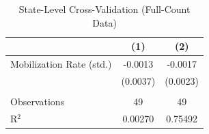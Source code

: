 
\begin{table}[htbp]
   \caption{\label{tab:statelevel} State-Level Cross-Validation (Full-Count Data)}
   \bigskip
   \centering
   \begin{tabular}{lcc}
      \toprule
                               & (1)      & (2)\\  
      \midrule 
      Mobilization Rate (std.) & -0.0013  & -0.0017\\   
                               & (0.0037) & (0.0023)\\   
       \\
      Observations             & 49       & 49\\  
      R$^2$                    & 0.00270  & 0.75492\\  
      \bottomrule
   \end{tabular}
\end{table}


